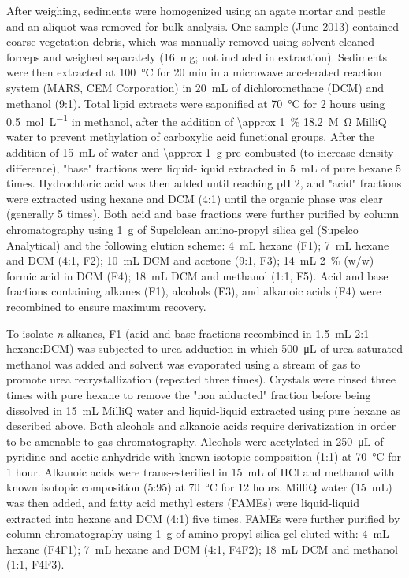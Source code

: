 After weighing, sediments were homogenized using an agate mortar and pestle and an aliquot was removed for bulk analysis. One sample (June 2013) contained coarse vegetation debris, which was manually removed using solvent-cleaned forceps and weighed separately (\SI{16}{mg}; not included in extraction). Sediments were then extracted at \SI{100}{\celsius} for 20 min in a microwave accelerated reaction system (MARS, CEM Corporation) in \SI{20}{mL} of dichloromethane (DCM) and methanol (9:1). Total lipid extracts were saponified at \SI{70}{\celsius} for 2 hours using \SI{0.5}{mol.L^{-1}}  in methanol, after the addition of \SI{\approx 1}{\%} \SI{18.2}{M \ohm} MilliQ water to prevent methylation of carboxylic acid functional groups. After the addition of \SI{15}{mL} of water and \SI{\approx 1}{g} pre-combusted  (to increase density difference), "base" fractions were liquid-liquid extracted in \SI{5}{mL} of pure hexane 5 times. Hydrochloric acid was then added until reaching pH $2$, and "acid" fractions were extracted using hexane and DCM (4:1) until the organic phase was clear (generally 5 times). Both acid and base fractions were further purified by column chromatography using \SI{1}{g} of Supelclean amino-propyl silica gel (Supelco Analytical) and the following elution scheme: \SI{4}{mL} hexane (F1); \SI{7}{mL} hexane and DCM (4:1, F2); \SI{10}{mL} DCM and acetone (9:1, F3); \SI{14}{mL} \SI{2}{\%} (w/w) formic acid in DCM (F4); \SI{18}{mL} DCM and methanol (1:1, F5). Acid and base fractions containing alkanes (F1), alcohols (F3), and alkanoic acids (F4) were recombined to ensure maximum recovery.

To isolate \textit{n}-alkanes, F1 (acid and base fractions recombined in \SI{1.5}{mL} 2:1 hexane:DCM) was subjected to urea adduction in which \SI{500}{\micro L} of urea-saturated methanol was added and solvent was evaporated using a stream of  gas to promote urea recrystallization (repeated three times). Crystals were rinsed three times with pure hexane to remove the "non adducted" fraction before being dissolved in \SI{15}{mL} MilliQ water and liquid-liquid extracted using pure hexane as described above. Both alcohols and alkanoic acids require derivatization in order to be amenable to gas chromatography. Alcohols were acetylated in \SI{250}{\micro L} of pyridine and acetic anhydride with known isotopic composition (1:1) at \SI{70}{\celsius} for 1 hour. Alkanoic acids were trans-esterified in \SI{15}{mL} of HCl and methanol with known isotopic composition (5:95) at \SI{70}{\celsius} for 12 hours. MilliQ water (\SI{15}{mL}) was then added, and fatty acid methyl esters (FAMEs) were liquid-liquid extracted into hexane and DCM (4:1) five times. FAMEs were further purified by column chromatography using \SI{1}{g} of amino-propyl silica gel eluted with: \SI{4}{mL} hexane (F4F1); \SI{7}{mL} hexane and DCM (4:1, F4F2); \SI{18}{mL} DCM and methanol (1:1, F4F3).

